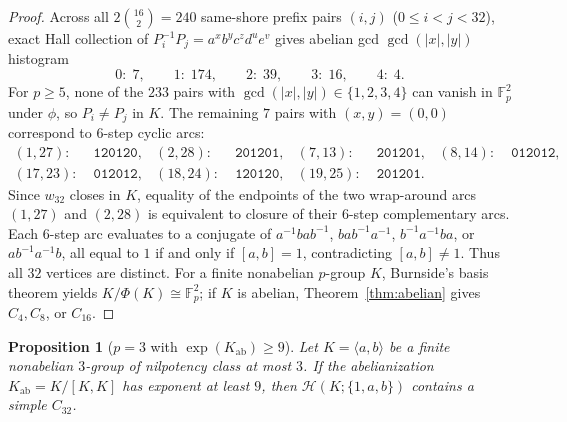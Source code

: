 \documentclass[11pt]{amsart}
\newtheorem{proposition}[theorem]{Proposition}
\theoremstyle{definition}
\theoremstyle{remark}
\newcommand{\F}{\mathbb{F}}
\newcommand{\Haar}{\mathcal{H}}
\begin{document}
\begin{proof}
Across all $2\binom{16}{2} = 240$ same-shore prefix pairs $(i,j)$ ($0 \le i < j < 32$), exact Hall collection of $P_i^{-1} P_j = a^x b^y c^z d^u e^v$ gives abelian gcd $\gcd(|x|, |y|)$ histogram
\[
0:\; 7,\qquad 1:\; 174,\qquad 2:\; 39,\qquad 3:\; 16,\qquad 4:\; 4.
\]
For $p \ge 5$, none of the $233$ pairs with $\gcd(|x|,|y|) \in \{1,2,3,4\}$ can vanish in $\F_p^2$ under $\phi$, so $P_i \ne P_j$ in $K$. The remaining $7$ pairs with $(x,y)=(0,0)$ correspond to $6$-step cyclic arcs:
\begin{align*}
(1,27):&\;\mathtt{120120}, & (2,28):&\;\mathtt{201201}, & (7,13):&\;\mathtt{201201}, & (8,14):&\;\mathtt{012012}, \\
(17,23):&\;\mathtt{012012}, & (18,24):&\;\mathtt{120120}, & (19,25):&\;\mathtt{201201}.
\end{align*}
Since $w_{32}$ closes in $K$, equality of the endpoints of the two wrap-around arcs $(1,27)$ and $(2,28)$ is equivalent to closure of their $6$-step complementary arcs. Each $6$-step arc evaluates to a conjugate of $a^{-1} b a b^{-1}$, $b a b^{-1} a^{-1}$, $b^{-1} a^{-1} b a$, or $a b^{-1} a^{-1} b$, all equal to $1$ if and only if $[a,b] = 1$, contradicting $[a,b] \ne 1$. Thus all $32$ vertices are distinct. For a finite nonabelian $p$-group $K$, Burnside's basis theorem yields $K/\Phi(K) \cong \F_p^2$; if $K$ is abelian, Theorem~\ref{thm:abelian} gives $C_4, C_8$, or $C_{16}$.
\end{proof}

\begin{proposition}[$p = 3$ with $\exp(K_{\mathrm{ab}}) \ge 9$]\label{prop:class3_p3_exp9}
Let $K = \langle a, b \rangle$ be a finite nonabelian $3$-group of nilpotency class at most $3$. If the abelianization $K_{\mathrm{ab}} = K/[K,K]$ has exponent at least $9$, then $\Haar(K; \{1,a,b\})$ contains a simple $C_{32}$.
\end{proposition}
\end{document}
